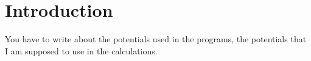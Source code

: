 \chapter{Introduction}
You have to write about the potentials used in the programs, the potentials
that I am supposed to use in the calculations.
